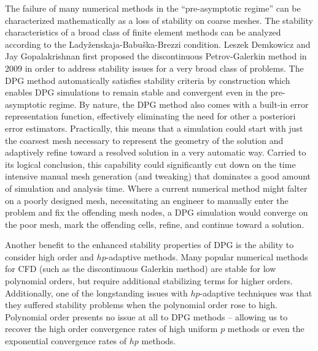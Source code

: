 \documentclass{report}
\begin{document}
The failure of many numerical methods in the ``pre-asymptotic regime'' can be characterized mathematically as a loss of stability on coarse meshes.
The stability characteristics of a broad class of finite element methods can be analyzed according to the Lady\v{z}enskaja-Babu\v{s}ka-Brezzi condition.
Leszek Demkowicz and Jay Gopalakrishnan first proposed the discontinuous Petrov-Galerkin method in 2009\cite{DPG1} in order to address stability issues for a 
very broad class of problems. The DPG method automatically satisfies stability criteria by construction which enables DPG simulations to remain stable and 
convergent even in the pre-asymptotic regime. 
By nature, the DPG method also comes with a built-in error representation function, effectively eliminating the need for other a posteriori error estimators.
Practically, this means that a simulation could start with just the coarsest mesh necessary to represent the geometry of the solution and adaptively refine toward a resolved solution in a very automatic way.
Carried to its logical conclusion, this capability could significantly cut down on the time intensive manual mesh generation (and tweaking) that dominates a good amount of simulation and analysis time.
Where a current numerical method might falter on a poorly designed mesh, necessitating an engineer to manually enter the problem and fix the offending mesh nodes, a DPG simulation would converge on the poor mesh, mark the offending cells, refine, and continue toward a solution.

Another benefit to the enhanced stability properties of DPG is the ability to consider high order and $hp$-adaptive methods. 
Many popular numerical methods for CFD (such as the discontinuous Galerkin method) are stable for low polynomial orders, but require additional stabilizing terms for higher orders. 
Additionally, one of the longstanding issues with $hp$-adaptive techniques was that they suffered stability problems when the polynomial order rose to high. 
Polynomial order presents no issue at all to DPG methods -- allowing us to recover the high order convergence rates of high uniform $p$ methods or even the exponential convergence rates of $hp$ methods.
\end{document}
